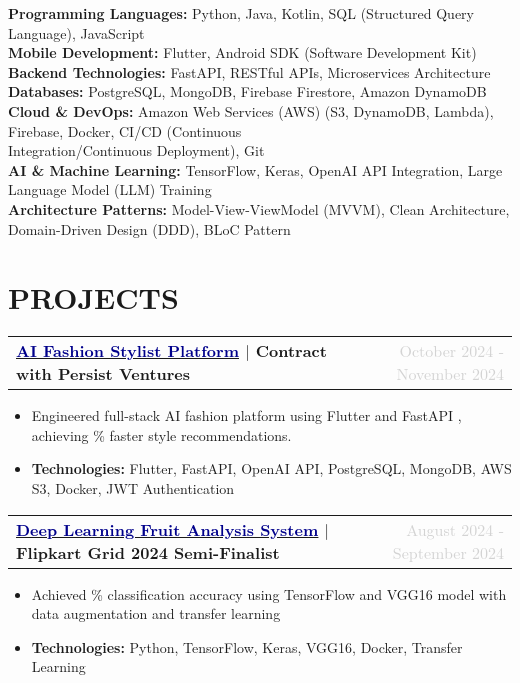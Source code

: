 \documentclass[10pt, a4paper]{article}
\makeatletter
\newcommand{\uhref}[2]{\href{#1}{\underline{\textcolor{darkblue}{#2}}}}
\DeclareRobustCommand{\semibold}[1]{%
  {\fontseries{sbc}\selectfont #1}%
}
\newcommand{\resumeProjectHeading}[2]{
  \vspace{4pt}  %
  \noindent
  \begin{tabular*}{\textwidth}[t]{@{}l@{\extracolsep{\fill}}r@{}}
    \textbf{#1} & \textcolor{lightgray}{\small #2} \\
  \end{tabular*}
  \vspace{-12pt}
}
\makeatother
\begin{document}
\textbf{Programming Languages:} Python, Java, Kotlin, SQL (Structured Query Language), JavaScript \\[3pt]
\textbf{Mobile Development:} Flutter, Android SDK (Software Development Kit) \\[3pt]
\textbf{Backend Technologies:} FastAPI, RESTful APIs, Microservices Architecture \\[3pt]
\textbf{Databases:} PostgreSQL, MongoDB, Firebase Firestore, Amazon DynamoDB \\[3pt]
\textbf{Cloud \& DevOps:} Amazon Web Services (AWS) (S3, DynamoDB, Lambda), Firebase, Docker, CI/CD (Continuous \\ Integration/Continuous Deployment), Git \\[3pt]
\textbf{AI \& Machine Learning:} TensorFlow, Keras, OpenAI API Integration, Large Language Model (LLM) Training\\[3pt]
\textbf{Architecture Patterns:} Model-View-ViewModel (MVVM), Clean Architecture, Domain-Driven Design (DDD), BLoC Pattern

\vspace{-6pt}

\section{PROJECTS}

\vspace{-4pt}
\resumeProjectHeading
{\uhref{https://github.com/harshsingh-io/lulu_stylist_app}{AI Fashion Stylist Platform} $|$ Contract with Persist Ventures}
{October 2024 - November 2024}
\begin{itemize}
    \item Engineered full-stack AI fashion platform using \semibold{Flutter} and \semibold{FastAPI}, achieving \semibold{40\% faster} style recommendations.
    \item \textbf{Technologies:} Flutter, FastAPI, OpenAI API, PostgreSQL, MongoDB, AWS S3, Docker, JWT Authentication
\end{itemize}

\resumeProjectHeading
{\uhref{https://github.com/harshsingh-io/fruit_freshness_analysis}{Deep Learning Fruit Analysis System} $|$ Flipkart Grid 2024 Semi-Finalist}
{August 2024 - September 2024}
\begin{itemize}
    \item Achieved \semibold{88\% classification accuracy} using TensorFlow and VGG16 model with data augmentation and transfer learning
    \item \textbf{Technologies:} Python, TensorFlow, Keras, VGG16, Docker, Transfer Learning
\end{itemize}
\end{document}
